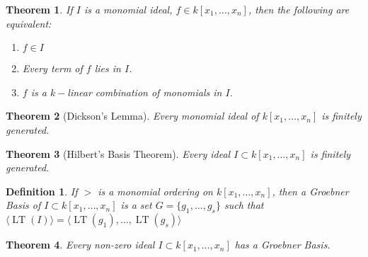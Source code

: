 \documentclass{article}
\theoremstyle{mystyle}
\newtheorem{theorem}{Theorem}[section]
\newtheorem{definition}{Definition}[section]
\DeclareMathOperator{\LT}{LT}
\begin{document}
\begin{theorem}
If $I$ is a monomial ideal, $f\in k[x_1,\hdots ,x_n]$, then the following are equivalent:
\begin{enumerate}
    \item $f\in I$
    \item Every term of $f$ lies in $I$.
    \item $f$ is a $k-$linear combination of monomials in $I$.
\end{enumerate}
\end{theorem}
\begin{theorem}[Dickson's Lemma]
Every monomial ideal of $k[x_1,\hdots ,x_n]$ is finitely generated.
\end{theorem}
\begin{theorem}[Hilbert's Basis Theorem]
Every ideal $I\subset k[x_1,\hdots ,x_n]$ is finitely generated.
\end{theorem}
\begin{definition}
If $>$ is a monomial ordering on $k[x_1,\hdots ,x_n]$, then a Groebner Basis of $I\subset k[x_1,\hdots ,x_n]$ is a set $G = \{g_1,\hdots, g_s\}$ such that $\langle \LT(I)\rangle = \langle \LT(g_1),\hdots, \LT(g_s)\rangle$
\end{definition}
\begin{theorem}
Every non-zero ideal $I\subset k[x_1,\hdots ,x_n]$ has a Groebner Basis.
\end{theorem}
\end{document}
